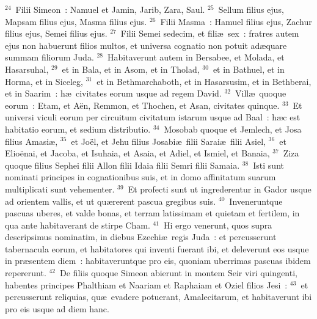 ${}^{24}$~Filii Simeon~: Namuel et Jamin, Jarib, Zara, Saul.
${}^{25}$~Sellum filius ejus, Mapsam filius ejus, Masma filius ejus.
${}^{26}$~Filii Masma~: Hamuel filius ejus, Zachur filius ejus, Semei filius ejus.
${}^{27}$~Filii Semei sedecim, et fili\ae\ sex~: fratres autem ejus non habuerunt filios multos, et universa cognatio non potuit ad\ae quare summam filiorum Juda.
${}^{28}$~Habitaverunt autem in Bersabee, et Molada, et Hasarsuhal,
${}^{29}$~et in Bala, et in Asom, et in Tholad,
${}^{30}$~et in Bathuel, et in Horma, et in Siceleg,
${}^{31}$~et in Bethmarchaboth, et in Hasarsusim, et in Bethberai, et in Saarim~: h\ae\ civitates eorum usque ad regem David.
${}^{32}$~Vill\ae\ quoque eorum~: Etam, et A\"en, Remmon, et Thochen, et Asan, civitates quinque.
${}^{33}$~Et universi viculi eorum per circuitum civitatum istarum usque ad Baal~: h\ae c est habitatio eorum, et sedium distributio.
${}^{34}$~Mosobab quoque et Jemlech, et Josa filius Amasi\ae ,
${}^{35}$~et Jo\"el, et Jehu filius Josabi\ae\ filii Sarai\ae\ filii Asiel,
${}^{36}$~et Elio\"enai, et Jacoba, et Isuhaia, et Asaia, et Adiel, et Ismiel, et Banaia,
${}^{37}$~Ziza quoque filius Sephei filii Allon filii Idaia filii Semri filii Samaia.
${}^{38}$~Isti sunt nominati principes in cognationibus suis, et in domo affinitatum suarum multiplicati sunt vehementer.
${}^{39}$~Et profecti sunt ut ingrederentur in Gador usque ad orientem vallis, et ut qu\ae rerent pascua gregibus suis.
${}^{40}$~Inveneruntque pascuas uberes, et valde bonas, et terram latissimam et quietam et fertilem, in qua ante habitaverant de stirpe Cham.
${}^{41}$~Hi ergo venerunt, quos supra descripsimus nominatim, in diebus Ezechi\ae\ regis Juda~: et percusserunt tabernacula eorum, et habitatores qui inventi fuerant ibi, et deleverunt eos usque in pr\ae sentem diem~: habitaveruntque pro eis, quoniam uberrimas pascuas ibidem repererunt.
${}^{42}$~De filiis quoque Simeon abierunt in montem Seir viri quingenti, habentes principes Phalthiam et Naariam et Raphaiam et Oziel filios Jesi~:
${}^{43}$~et percusserunt reliquias, qu\ae\ evadere potuerant, Amalecitarum, et habitaverunt ibi pro eis usque ad diem hanc.

